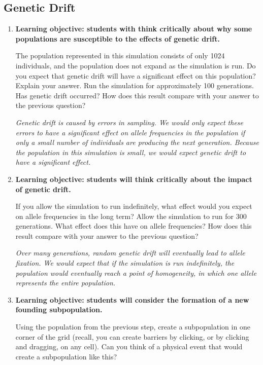 \documentclass[12pt]{article}
\begin{document}
\begin{spacing}{1.5}
\subsection{Genetic Drift}
\begin{enumerate}
\item
\par \textbf{Learning objective: students with think critically about why some populations are susceptible to the effects of genetic drift.}
\par The population represented in this simulation consists of only 1024 individuals, and the population does not expand as the simulation is run. Do you expect that genetic drift will have a significant effect on this population? Explain your answer. Run the simulation for approximately 100 generations. Has genetic drift occurred? How does this result compare with your answer to the previous question?
\par \textit{Genetic drift is caused by errors in sampling. We would only expect these errors to have a significant effect on allele frequencies in the population if only a small number of individuals are producing the next generation. Because the population in this simulation is small, we would expect genetic drift to have a significant effect.}
\item
\par \textbf{Learning objective: students will think critically about the impact of genetic drift.}
\par If you allow the simulation to run indefinitely, what effect would you expect on allele frequencies in the long term? Allow the simulation to run for 300 generations. What effect does this have on allele frequencies? How does this result compare with your answer to the previous question?
\par \textit{Over many generations, random genetic drift will eventually lead to allele fixation. We would expect that if the simulation is run indefinitely, the population would eventually reach a point of homogeneity, in which one allele represents the entire population.}
\item
\par \textbf{Learning objective: students will consider the formation of a new founding subpopulation.}
\par Using the population from the previous step, create a subpopulation in one corner of the grid (recall, you can create barriers by clicking, or by clicking and dragging, on any cell). Can you think of a physical event that would create a subpopulation like this?

\end{enumerate}
\end{spacing}
\end{document}

